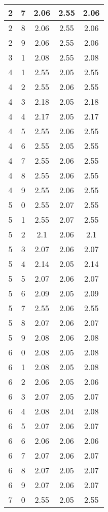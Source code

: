 \begin{longtable}{|c|c||c||c||c|}
	2 & 7 & 2.06 & 2.55 & 2.06 \\ \hline
	2 & 8 & 2.06 & 2.55 & 2.06 \\ \hline
	2 & 9 & 2.06 & 2.55 & 2.06 \\ \hline
	3 & 1 & 2.08 & 2.55 & 2.08 \\ \hline
	4 & 1 & 2.55 & 2.05 & 2.55 \\ \hline
	4 & 2 & 2.55 & 2.06 & 2.55 \\ \hline
	4 & 3 & 2.18 & 2.05 & 2.18 \\ \hline
	4 & 4 & 2.17 & 2.05 & 2.17 \\ \hline
	4 & 5 & 2.55 & 2.06 & 2.55 \\ \hline
	4 & 6 & 2.55 & 2.05 & 2.55 \\ \hline
	4 & 7 & 2.55 & 2.06 & 2.55 \\ \hline
	4 & 8 & 2.55 & 2.06 & 2.55 \\ \hline
	4 & 9 & 2.55 & 2.06 & 2.55 \\ \hline
	5 & 0 & 2.55 & 2.07 & 2.55 \\ \hline
	5 & 1 & 2.55 & 2.07 & 2.55 \\ \hline
	5 & 2 & 2.1 & 2.06 & 2.1 \\ \hline
	5 & 3 & 2.07 & 2.06 & 2.07 \\ \hline
	5 & 4 & 2.14 & 2.05 & 2.14 \\ \hline
	5 & 5 & 2.07 & 2.06 & 2.07 \\ \hline
	5 & 6 & 2.09 & 2.05 & 2.09 \\ \hline
	5 & 7 & 2.55 & 2.06 & 2.55 \\ \hline
	5 & 8 & 2.07 & 2.06 & 2.07 \\ \hline
	5 & 9 & 2.08 & 2.06 & 2.08 \\ \hline
	6 & 0 & 2.08 & 2.05 & 2.08 \\ \hline
	6 & 1 & 2.08 & 2.05 & 2.08 \\ \hline
	6 & 2 & 2.06 & 2.05 & 2.06 \\ \hline
	6 & 3 & 2.07 & 2.05 & 2.07 \\ \hline
	6 & 4 & 2.08 & 2.04 & 2.08 \\ \hline
	6 & 5 & 2.07 & 2.06 & 2.07 \\ \hline
	6 & 6 & 2.06 & 2.06 & 2.06 \\ \hline
	6 & 7 & 2.07 & 2.06 & 2.07 \\ \hline
	6 & 8 & 2.07 & 2.05 & 2.07 \\ \hline
	6 & 9 & 2.07 & 2.06 & 2.07 \\ \hline
	7 & 0 & 2.55 & 2.05 & 2.55 \\ \hline

\end{longtable}
